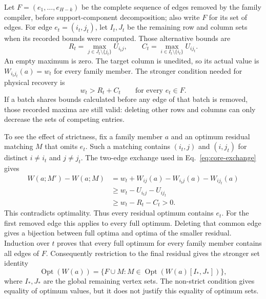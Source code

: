 \documentclass[11pt]{article}
\begin{document}
Let $F=(e_1,\ldots,e_{H-k})$ be the complete sequence of edges removed by the family compiler, before support-component decomposition; also write $F$ for its set of edges. For edge $e_t=(i_t,j_t)$, let $I_t,J_t$ be the remaining row and column sets when its recorded bounds were computed. Those alternative bounds are
\begin{equation}\label{eq:lift-recorded-bounds}
R_t=\max_{j\in J_t\setminus\{j_t\}}U_{i_tj},\qquad C_t=\max_{i\in I_t\setminus\{i_t\}}U_{ij_t}.
\end{equation}
An empty maximum is zero. The target column is unedited, so its actual value is $W_{i_tj_t}(a)=w_t$ for every family member. The stronger condition needed for physical recovery is
\begin{equation}\label{eq:lift-strict}
w_t>R_t+C_t\qquad\text{for every }e_t\in F.
\end{equation}
If a batch shares bounds calculated before any edge of that batch is removed, those recorded maxima are still valid: deleting other rows and columns can only decrease the sets of competing entries.

To see the effect of strictness, fix a family member $a$ and an optimum residual matching $M$ that omits $e_t$. Such a matching contains $(i_t,j)$ and $(i,j_t)$ for distinct $i\ne i_t$ and $j\ne j_t$. The two-edge exchange used in Eq.~\eqref{eq:core-exchange} gives
\begin{align}
W(a;M')-W(a;M)
&=w_t+W_{ij}(a)-W_{i_tj}(a)-W_{ij_t}(a)\nonumber\\
&\ge w_t-U_{i_tj}-U_{ij_t}\nonumber\\
&\ge w_t-R_t-C_t>0.\label{eq:lift-strict-exchange}
\end{align}
This contradicts optimality. Thus every residual optimum contains $e_t$. For the first removed edge this applies to every full optimum. Deleting that common edge gives a bijection between full optima and optima of the smaller residual. Induction over $t$ proves that every full optimum for every family member contains all edges of $F$. Consequently restriction to the final residual gives the stronger set identity
\begin{equation}\label{eq:lift-optimum-set}
\operatorname{Opt}(W(a))=\{F\cup M: M\in\operatorname{Opt}(W(a)[I_*,J_*])\},
\end{equation}
where $I_*,J_*$ are the global remaining vertex sets. The non-strict condition gives equality of optimum values, but it does not justify this equality of optimum sets.
\end{document}
